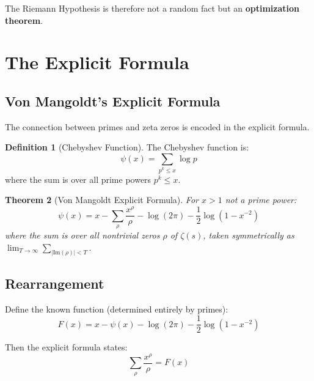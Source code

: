\documentclass[12pt,a4paper]{article}
\newtheorem{theorem}{Theorem}[section]
\theoremstyle{definition}
\newtheorem{definition}[theorem]{Definition}
\theoremstyle{remark}
\begin{document}
The Riemann Hypothesis is therefore not a random fact but an \textbf{optimization theorem}.

\section{The Explicit Formula}
\label{sec:explicit}

\subsection{Von Mangoldt's Explicit Formula}

The connection between primes and zeta zeros is encoded in the explicit formula.

\begin{definition}[Chebyshev Function]
The Chebyshev function is:
\begin{equation}
\psi(x) = \sum_{p^k \leq x} \log p
\end{equation}
where the sum is over all prime powers $p^k \leq x$.
\end{definition}

\begin{theorem}[Von Mangoldt Explicit Formula]
For $x > 1$ not a prime power:
\begin{equation}
\psi(x) = x - \sum_{\rho} \frac{x^\rho}{\rho} - \log(2\pi) - \frac{1}{2}\log(1-x^{-2})
\label{eq:explicit}
\end{equation}
where the sum is over all nontrivial zeros $\rho$ of $\zeta(s)$, taken symmetrically as $\lim_{T\to\infty} \sum_{|\text{Im}(\rho)| < T}$.
\end{theorem}

\subsection{Rearrangement}

Define the known function (determined entirely by primes):
\begin{equation}
F(x) = x - \psi(x) - \log(2\pi) - \frac{1}{2}\log(1-x^{-2})
\end{equation}

Then the explicit formula states:
\begin{equation}
\sum_{\rho} \frac{x^\rho}{\rho} = F(x)
\label{eq:explicit_rearranged}
\end{equation}
\end{document}
